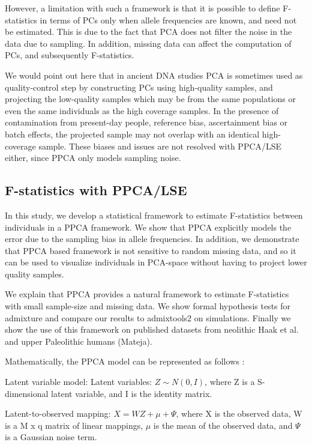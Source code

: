 \documentclass[12pt, letterpaper]{article}
\begin{document}
However, a limitation with such a framework is that it is possible to define F-statistics in terms of PCs only when allele frequencies are known, and need not be estimated. This is due to the fact that PCA does not filter the noise in the data due to sampling. In addition, missing data can affect the computation of PCs, and subsequently F-statistics.


We would point out here that in ancient DNA studies PCA is sometimes used as quality-control step by constructing PCs using high-quality samples, and projecting the low-quality samples which may be from the same populations or even the same individuals as the high coverage samples. In the presence of contamination from present-day people, reference bias, ascertainment bias or batch effects, the projected sample may not overlap with an identical high-coverage sample. These biases and issues are not resolved with PPCA/LSE either, since PPCA only models sampling noise. 


\subsection{F-statistics with PPCA/LSE}
In this study, we develop a statistical framework to estimate F-statistics between individuals in a PPCA framework. We show that PPCA explicitly models the error due to the sampling bias in allele frequencies. In addition, we demonstrate that PPCA based framework is not sensitive to random missing data, and so it can be used to visualize individuals in PCA-space without having to project lower quality samples.

We explain that PPCA provides a natural framework to estimate F-statistics with small sample-size and missing data. We show formal hypothesis tests for admixture and compare our results to admixtools2 \cite{maier_limits_2022} on simulations. Finally we show the use of this framework on published datasets from neolithic Haak et al. and upper Paleolithic humans (Mateja). 

Mathematically, the PPCA model can be represented as follows \cite{tipping_probabilistic_1999-1}:

Latent variable model:
Latent variables: $Z \sim N(0, I)$, where Z is a S-dimensional latent variable, and I is the identity matrix.

Latent-to-observed mapping: $X = WZ + \mu + \Psi$, where X is the observed data, W is a M x q matrix of linear mappings, $\mu$ is the mean of the observed data, and $\Psi$ is a Gaussian noise term.
\end{document}
